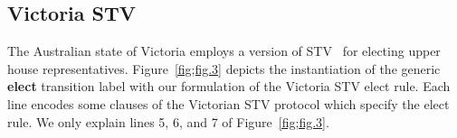 \documentclass{llncs}
\begin{document}
\subsection{Victoria STV}
The Australian state of Victoria employs a version of
STV~\cite{ofVictoria:2002:EA} for  electing upper house representatives. 
Figure~\ref{fig;fig.3} depicts the instantiation of the generic
\textbf{elect} transition label with our formulation of the Victoria
STV elect rule. Each line 
encodes some clauses of the Victorian STV protocol
which specify the elect rule.  We only explain lines 5, 6, and 7 of
Figure~\ref{fig;fig.3}.
\end{document}
